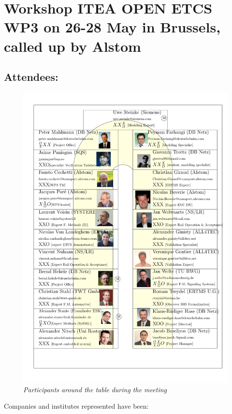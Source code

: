 \documentclass{template/openetcs_report}
\begin{document}
\chapter*{Workshop {\bf ITEA OPEN ETCS WP3} on 26-28 May in Brussels, called up by Alstom}
\section*{Attendees: }
\begin{figure}[!ht]
\centerline{
\includegraphics[angle=-0,width=.95\textwidth]{table2r.pdf}
}
\caption{\emph{Participants around the table during the meeting}}
\label {fig:table}
\end{figure}

Companies and institutes represented have been:
\end{document}
